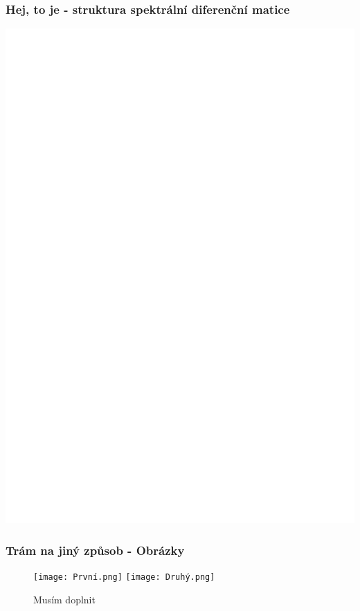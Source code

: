 \documentclass{beamer}
\begin{document}
\begin{frame}
\frametitle{Hej, to je - struktura spektrální diferenční matice}
\centering
\includegraphics[scale=0.5]{d-matrix-chebyshev-structure}   
\end{frame}
                
\begin{frame}
\frametitle{Trám na jiný způsob - Obrázky}
\centering
\begin{figure}
\texttt{[image: První.png]}
\texttt{[image: Druhý.png]}
\caption{Musím doplnit}
\end{figure}
\end{frame}
\end{document}
